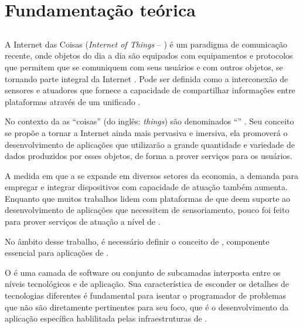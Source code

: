 \chapter{Fundamentação teórica} \label{chap:fundamentacao}

\section{\iot}

A Internet das Coisas (\textit{Internet of Things} -- \iot) é um paradigma de comunicação recente, onde objetos do dia a dia são equipados com equipamentos e protocolos que permitem que se comuniquem com seus usuários e com outros objetos, se tornando parte integral da Internet \cite{Atzori:2010}.  Pode ser definida como a interconexão de sensores e atuadores que fornece a capacidade de compartilhar informações entre plataformas através de um \framework{} unificado \cite{gubbi2013internet}. 

No contexto da \iot{} as ``coisas'' (do inglês: \textit{things}) são denominados ``\smartobjs'' \cite{bandyopadhyay2011internet}. Seu conceito se propõe a tornar a Internet ainda mais pervasiva e imersiva, ela promoverá o desenvolvimento de aplicações que utilizarão a grande quantidade e variedade de dados produzidos por esses objetos, de forma a prover serviços para os usuários. 

A medida em que a \iot{} se expande em diversos setores da economia, a demanda para empregar e integrar dispositivos com capacidade de atuação também aumenta. Enquanto que muitos trabalhos lidem com plataformas de \middleware{} que deem suporte ao desenvolvimento de aplicações que necessitem de sensoriamento, pouco foi feito para prover serviços de atuação a nível de \middleware{} \cite{OJIOT_2018v4i1n03_Valim}.

No âmbito desse trabalho, é necessário definir o conceito de \middleware{}, componente essencial para aplicações de \iot{}.
\begin{citacao}
	O \middleware{} é uma camada de software ou conjunto de subcamadas interposta entre os níveis tecnológicos e de aplicação. Sua característica de esconder os detalhes de tecnologias diferentes é fundamental para isentar o programador de problemas que não são diretamente pertinentes para seu foco, que é o desenvolvimento da aplicação específica hablilitada pelas infraestruturas de \iot{}. \cite[tradução~nossa]{Atzori:2010}
\end{citacao}

